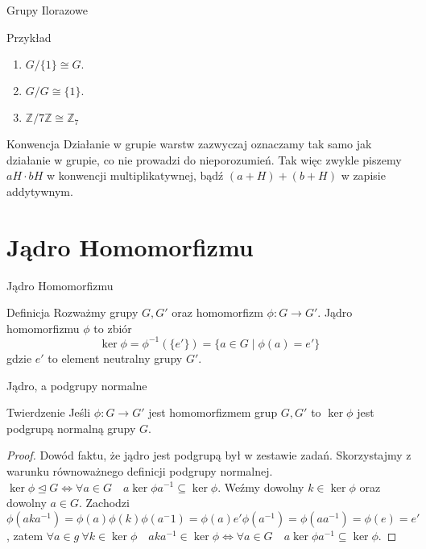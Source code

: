 \documentclass{beamer}
\begin{document}
\begin{frame}{Grupy Ilorazowe}
    \begin{exampleblock}{Przykład}
        \begin{enumerate}
            \item $G/\{1\} \cong G.$
            \item $G/G \cong \{1\}.$
            \item $\mathbb{Z} / 7\mathbb{Z} \cong \mathbb{Z}_7$
        \end{enumerate}
    \end{exampleblock}

\begin{alertblock}{Konwencja}
    Działanie w grupie warstw zazwyczaj oznaczamy tak samo jak działanie w grupie, co nie prowadzi do nieporozumień.
    Tak więc zwykle piszemy $aH \cdot bH$ w konwencji multiplikatywnej, bądź $(a + H) + (b + H)$ w zapisie addytywnym. 
\end{alertblock}
\end{frame}

\section{Jądro Homomorfizmu}

\begin{frame}{Jądro Homomorfizmu}
    \begin{block}{Definicja}
        Rozważmy grupy $G, G'$ oraz homomorfizm $\phi : G \rightarrow G'$. Jądro homomorfizmu $\phi$ to zbiór
        $$\ker \phi = \phi^{-1}(\{e'\}) = \{ a \in G \mid \phi(a) = e' \}  $$
        gdzie $e'$ to element neutralny grupy $G'$.
    \end{block}
\end{frame}

\begin{frame}{Jądro, a podgrupy normalne}
    \begin{block}{Twierdzenie}
        Jeśli $\phi : G \rightarrow  G'$ jest homomorfizmem grup $G, G'$ to $\ker \phi$ jest podgrupą normalną grupy $G$.
    \end{block}
    \pause 
    \begin{proof}
        Dowód faktu, że jądro jest podgrupą był w zestawie zadań. Skorzystajmy z warunku równoważnego definicji podgrupy normalnej.
        $\ker \phi \trianglelefteq G \Leftrightarrow \forall a \in G \quad a \ker \phi a^{-1} \subseteq \ker \phi$. 
        Weźmy dowolny $k \in \ker \phi$ oraz dowolny $a \in G$. Zachodzi $\phi(aka^{-1}) = \phi(a) \phi(k) \phi(a^-1) = \phi(a) e' \phi(a^{-1}) = \phi(a a^{-1}) = \phi(e) = e'$, 
        zatem $\forall a \in g  \ \forall k \in \ker \phi \quad a k a^{-1} \in \ker \phi  \Leftrightarrow \forall a \in G \quad a \ker \phi a^{-1} \subseteq \ker \phi$.
    \end{proof}
\end{frame}
\end{document}
